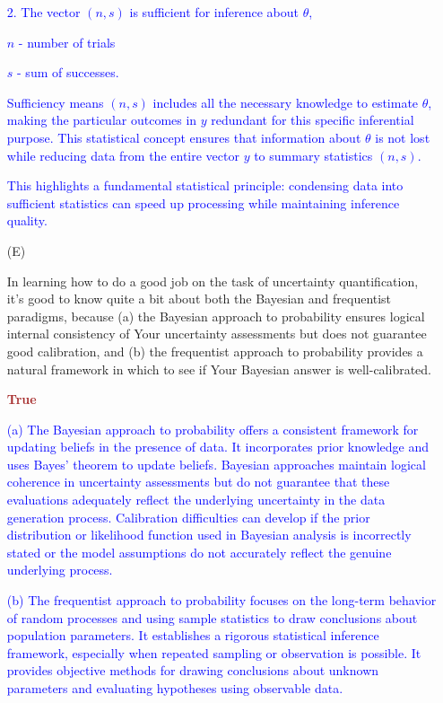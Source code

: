 \documentclass[12pt]{article}
\begin{document}
\begin{itemize}
\textcolor{blue}{2. The vector $(n, s)$ is sufficient for inference about $\theta$,}

\textcolor{blue}{$n$ - number of trials}

\textcolor{blue}{$s$ - sum of successes.}

\textcolor{blue}{Sufficiency means $(n, s)$ includes all the necessary knowledge to estimate $\theta$, making the particular outcomes in $y$ redundant for this specific inferential purpose. This statistical concept ensures that information about $\theta$ is not lost while reducing data from the entire vector $y$ to summary statistics $(n, s)$.}

\textcolor{blue}{This highlights a fundamental statistical principle: condensing data into sufficient statistics can speed up processing while maintaining inference quality.}

\item[(E)]

In learning how to do a good job on the task of uncertainty quantification,
it's good to know quite a bit about both the Bayesian and frequentist
paradigms, because (a) the Bayesian approach to probability ensures logical
internal consistency of Your uncertainty assessments but does not guarantee
good calibration, and (b) the frequentist approach to probability provides
a natural framework in which to see if Your Bayesian answer is
well-calibrated.

\textcolor{brown}{\textbf{True}}

\textcolor{blue}{(a) The Bayesian approach to probability offers a consistent framework for updating beliefs in the presence of data. It incorporates prior knowledge and uses Bayes' theorem to update beliefs. Bayesian approaches maintain logical coherence in uncertainty assessments but do not guarantee that these evaluations adequately reflect the underlying uncertainty in the data generation process. Calibration difficulties can develop if the prior distribution or likelihood function used in Bayesian analysis is incorrectly stated or the model assumptions do not accurately reflect the genuine underlying process.}

\textcolor{blue}{(b) The frequentist approach to probability focuses on the long-term behavior of random processes and using sample statistics to draw conclusions about population parameters. It establishes a rigorous statistical inference framework, especially when repeated sampling or observation is possible. It provides objective methods for drawing conclusions about unknown parameters and evaluating hypotheses using observable data.}


\end{itemize}
\end{document}
